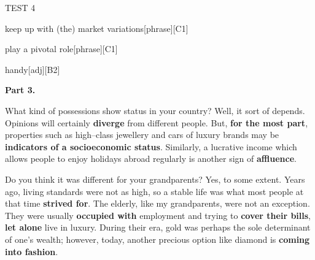\begin{glossarymc}[Cambridge 3]
\begin{test}{TEST 4}
\begin{VocabExplain}[Part 2]
\begin{ExplainCard}{keep up with (the) market variations}[phrase][C1]
\end{ExplainCard}

\begin{ExplainCard}{play a pivotal role}[phrase][C1]
\end{ExplainCard}

\begin{ExplainCard}{handy}[adj][B2]
\end{ExplainCard}
\end{VocabExplain}


\noindent
\textbf{Part 3.}

\begin{qa}{What kind of possessions show status in your country?}
Well, it sort of depends. Opinions will certainly \textbf{diverge} from different people. But, \textbf{for the most part}, properties such as high–class jewellery and cars of luxury brands may be \textbf{indicators of a socioeconomic status}. Similarly, a lucrative income which allows people to enjoy holidays abroad regularly is another sign of \textbf{affluence}.
\end{qa}

\begin{qa}{Do you think it was different for your grandparents?}
Yes, to some extent. Years ago, living standards were not as high, so a stable life was what most people at that time \textbf{strived for}. The elderly, like my grandparents, were not an exception. They were usually \textbf{occupied with} employment and trying to \textbf{cover their bills}, \textbf{let alone} live in luxury. During their era, gold was perhaps the sole determinant of one’s wealth; however, today, another precious option like diamond is \textbf{coming into fashion}.
\end{qa}


\end{test}
\end{glossarymc}
